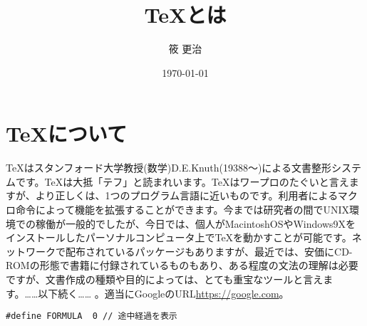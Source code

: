 \documentclass[twocolumn,10pt]{jarticle}
\title{\TeX とは}
\author{筱 更治}
\date{\today}
\begin{document}
 
\maketitle 
\section{\TeX について}

TeXはスタンフォード大学教授(数学)D.E.Knuth(19388～)による文書整形システムです。TeXは大抵「テフ」と読まれいます。TeXはワープロのたぐいと言えますが、より正しくは、1つのプログラム言語に近いものです。利用者によるマクロ命令によって機能を拡張することができます。今までは研究者の間でUNIX環境での稼働が一般的でしたが、今日では、個人がMacintoshOSやWindows9Xをインストールしたパーソナルコンピュータ上でTeXを動かすことが可能です。ネットワークで配布されているパッケージもありますが、最近では、安価にCD-ROMの形態で書籍に付録されているものもあり、ある程度の文法の理解は必要ですが、文書作成の種類や目的によっては、とても重宝なツールと言えます。……以下続く…… 。適当にGoogleのURL\url{https://google.com}。

\begin{lstlisting}[caption=FORMURAの定義]
#define FORMULA  0 // 途中経過を表示
\end{lstlisting}


\end{document}
